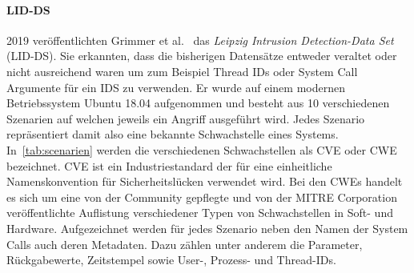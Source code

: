             \paragraph{LID-DS}
                2019 veröffentlichten Grimmer et al.~\cite{LIDDS} das \textit{Leipzig Intrusion Detection-Data Set} (LID-DS).
                Sie erkannten, dass die bisherigen Datensätze entweder veraltet oder nicht ausreichend waren um zum Beispiel Thread IDs oder System Call Argumente für ein \ac{IDS} zu verwenden.
                Er wurde auf einem modernen Betriebssystem Ubuntu 18.04 aufgenommen und besteht aus 10 verschiedenen Szenarien auf welchen jeweils ein Angriff ausgeführt wird.
                Jedes Szenario repräsentiert damit also eine bekannte Schwachstelle eines Systems.
                In~\autoref{tab:scenarien} werden die verschiedenen Schwachstellen als \ac{CVE}
                 oder \ac{CWE}  bezeichnet.
                CVE ist ein Industriestandard der für eine einheitliche Namenskonvention für Sicherheitslücken verwendet wird.
                Bei den CWEs handelt es sich um eine von der Community gepflegte und von der MITRE Corporation veröffentlichte Auflistung verschiedener Typen von Schwachstellen in Soft- und Hardware.
                Aufgezeichnet werden für jedes Szenario neben den Namen der System Calls auch deren Metadaten.
                Dazu zählen unter anderem die Parameter, Rückgabewerte, Zeitstempel sowie User-, Prozess- und Thread-IDs.
